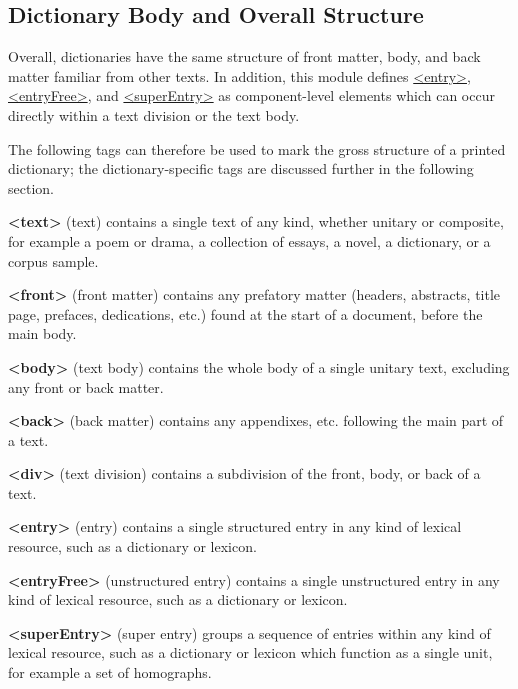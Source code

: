 \subsection[{Dictionary Body and Overall Structure}]{Dictionary Body and Overall Structure}\label{DIBO}\par
Overall, dictionaries have the same structure of front matter, body, and back matter familiar from other texts. In addition, this module defines \hyperref[TEI.entry]{<entry>}, \hyperref[TEI.entryFree]{<entryFree>}, and \hyperref[TEI.superEntry]{<superEntry>} as component-level elements which can occur directly within a text division or the text body.\par
The following tags can therefore be used to mark the gross structure of a printed dictionary; the dictionary-specific tags are discussed further in the following section.
\begin{sansreflist}
  
\item [\textbf{<text>}] (text) contains a single text of any kind, whether unitary or composite, for example a poem or drama, a collection of essays, a novel, a dictionary, or a corpus sample.
\item [\textbf{<front>}] (front matter) contains any prefatory matter (headers, abstracts, title page, prefaces, dedications, etc.) found at the start of a document, before the main body.
\item [\textbf{<body>}] (text body) contains the whole body of a single unitary text, excluding any front or back matter.
\item [\textbf{<back>}] (back matter) contains any appendixes, etc. following the main part of a text.
\item [\textbf{<div>}] (text division) contains a subdivision of the front, body, or back of a text.
\item [\textbf{<entry>}] (entry) contains a single structured entry in any kind of lexical resource, such as a dictionary or lexicon.
\item [\textbf{<entryFree>}] (unstructured entry) contains a single unstructured entry in any kind of lexical resource, such as a dictionary or lexicon.
\item [\textbf{<superEntry>}] (super entry) groups a sequence of entries within any kind of lexical resource, such as a dictionary or lexicon which function as a single unit, for example a set of homographs.
\end{sansreflist}
\par
